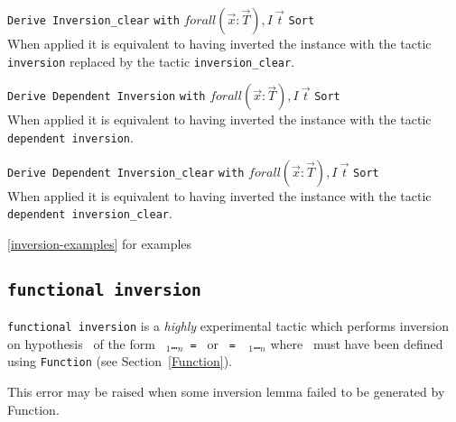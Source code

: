 \begin{Variants}
\item \texttt{Derive Inversion\_clear} {\ident} \texttt{with}
  $forall (\vec{x}:\vec{T}), I~\vec{t}$ \texttt{Sort} \sort~ \\ 
  When applied it is equivalent to having
  inverted the instance with the tactic \texttt{inversion}
  replaced by the tactic \texttt{inversion\_clear}.
\item \texttt{Derive Dependent Inversion} {\ident} \texttt{with}
  $forall (\vec{x}:\vec{T}), I~\vec{t}$ \texttt{Sort} \sort~\\
  When applied it is equivalent to having
  inverted the instance with the tactic \texttt{dependent inversion}.
\item \texttt{Derive Dependent Inversion\_clear} {\ident} \texttt{with}
  $forall (\vec{x}:\vec{T}), I~\vec{t}$ \texttt{Sort} \sort~\\
  When applied it is equivalent to having
  inverted the instance with the tactic \texttt{dependent inversion\_clear}.
\end{Variants}

\SeeAlso \ref{inversion-examples} for examples



\subsection[\tt functional inversion \ident]{\tt functional inversion \ident\label{sec:functional-inversion}}

\texttt{functional inversion} is a \emph{highly} experimental tactic
which performs inversion on hypothesis \ident\ of the form
\texttt{\qualid\ \term$_1$\dots\term$_n$\ = \term} or \texttt{\term\ =
  \qualid\ \term$_1$\dots\term$_n$} where \qualid\ must have been
defined using \texttt{Function} (see Section~\ref{Function}).

\begin{ErrMsgs}
\item {}
\item {}
  This error may be raised when  some inversion lemma failed to be
  generated by Function.
\end{ErrMsgs}


